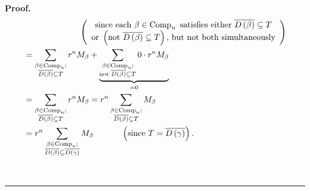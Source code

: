 \documentclass[numbers=enddot,12pt,final,onecolumn,notitlepage]{scrartcl}%
\theoremstyle{definition}
\newenvironment{proof}[1][Proof]{\noindent\textbf{#1.} }{\ \rule{0.5em}{0.5em}}
\let\sumnonlimits\sum
\renewcommand{\sum}{\sumnonlimits\limits}
\newenvironment{verlong}{}{}
\begin{document}
\begin{verlong}
\begin{proof}
\begin{align}
&  \ \ \ \ \ \ \ \ \ \ \ \ \ \ \ \ \ \ \ \ \left(
\begin{array}
[c]{c}%
\text{since each }\beta\in\operatorname*{Comp}\nolimits_{n}\text{ satisfies
either }\overline{D\left(  \beta\right)  }\subseteq T\\
\text{or }\left(  \text{not }\overline{D\left(  \beta\right)  }\subseteq
T\right)  \text{, but not both simultaneously}%
\end{array}
\right) \nonumber\\
&  =\sum_{\substack{\beta\in\operatorname*{Comp}\nolimits_{n};\\\overline
{D\left(  \beta\right)  }\subseteq T}}r^{n}M_{\beta}+\underbrace{\sum
_{\substack{\beta\in\operatorname*{Comp}\nolimits_{n};\\\text{not }%
\overline{D\left(  \beta\right)  }\subseteq T}}0\cdot r^{n}M_{\beta}}%
_{=0}\nonumber\\
&  =\sum_{\substack{\beta\in\operatorname*{Comp}\nolimits_{n};\\\overline
{D\left(  \beta\right)  }\subseteq T}}r^{n}M_{\beta}=r^{n}\sum
_{\substack{\beta\in\operatorname*{Comp}\nolimits_{n};\\\overline{D\left(
\beta\right)  }\subseteq T}}M_{\beta}\nonumber\\
&  =r^{n}\sum_{\substack{\beta\in\operatorname*{Comp}\nolimits_{n}%
;\\\overline{D\left(  \beta\right)  }\subseteq\overline{D\left(
\gamma\right)  }}}M_{\beta}\ \ \ \ \ \ \ \ \ \ \left(  \text{since
}T=\overline{D\left(  \gamma\right)  }\right)  .
\label{pf.prop.eta.F-through.long.at}%
\end{align}



\end{proof}
\end{verlong}
\end{document}
